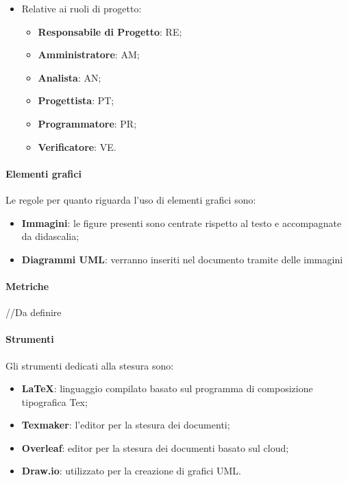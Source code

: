 \begin{itemize}
\begin{itemize}
    \item Relative ai ruoli di progetto:
        \begin{itemize}
        \item \textbf{Responsabile di Progetto}: RE;
        \item \textbf{Amministratore}: AM;
        \item \textbf{Analista}: AN;
        \item \textbf{Progettista}: PT;
        \item \textbf{Programmatore}: PR;
        \item \textbf{Verificatore}: VE.
        \end{itemize}
    \end{itemize}
\end{itemize}

\paragraph{Elementi grafici}
Le regole per quanto riguarda l’uso di elementi grafici sono:
\begin{itemize}
\item \textbf{Immagini}: le figure presenti sono centrate rispetto al testo e accompagnate da didascalia;
\item \textbf{Diagrammi UML}: verranno inseriti nel documento tramite delle immagini
\end{itemize}

\paragraph{Metriche}
//Da definire

\paragraph{Strumenti}
Gli strumenti dedicati alla stesura sono:
\begin{itemize}
\item \textbf{\LaTeX}: linguaggio compilato basato sul programma di composizione tipografica Tex;
\item \textbf{Texmaker}: l’editor per la stesura dei documenti;
\item \textbf{Overleaf}: editor per la stesura dei documenti basato sul cloud;
\item \textbf{Draw.io}: utilizzato per la creazione di grafici UML. 
\end{itemize}

